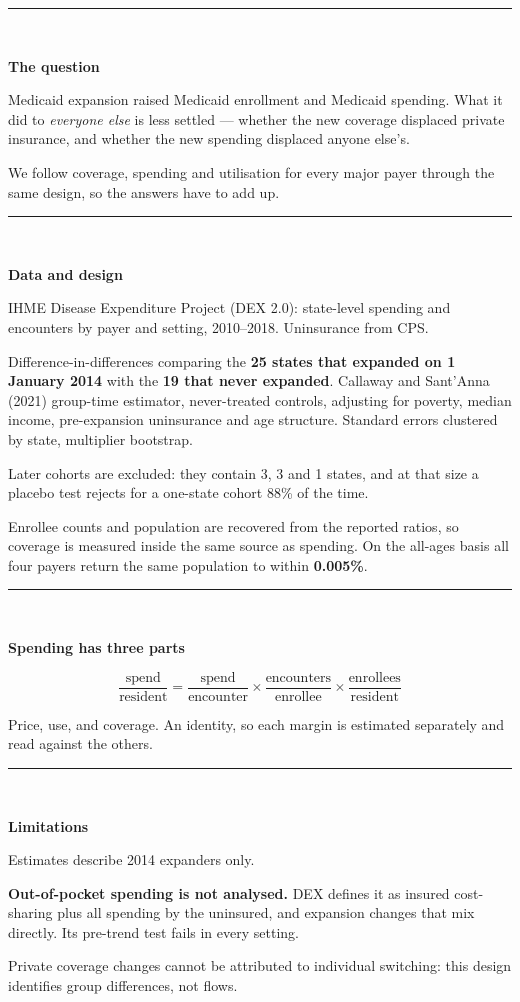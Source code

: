 \documentclass[final]{article}
\newlength{\colw}\setlength{\colw}{247mm}
\newlength{\colh}\setlength{\colh}{845mm}
\newcommand{\Body}[1]{{\fontsize{29}{40}\selectfont\RaggedRight #1\par}}
\newcommand{\Note}[1]{{\fontsize{23}{31}\selectfont\color{WarmGray}\RaggedRight #1\par}}
\newcommand{\Num}[1]{\textbf{\color{Treat}#1}}
\newcommand{\panel}[2]{%
  \noindent\begin{minipage}[t]{\colw}%
    {\color{LightGray}\rule{\colw}{2.5pt}}\\[4mm]
    {\fontsize{38}{46}\selectfont\bfseries\color{DeepNavy}\RaggedRight #1\par}
    \vspace{5mm} #2
  \end{minipage}}
\begin{document}
\begin{minipage}[t][\colh][t]{\colw}
\panel{The question}{
  \Body{Medicaid expansion raised Medicaid enrollment and Medicaid spending. What it did to
  \emph{everyone else} is less settled --- whether the new coverage displaced private
  insurance, and whether the new spending displaced anyone else's.}
  \vspace{4mm}
  \Body{We follow coverage, spending and utilisation for every major payer through the
  same design, so the answers have to add up.}
}
\vfill
\panel{Data and design}{
  \Body{IHME Disease Expenditure Project (DEX 2.0): state-level spending and encounters by
  payer and setting, 2010--2018. Uninsurance from CPS.}
  \vspace{4mm}
  \Body{Difference-in-differences comparing the \Num{25 states that expanded on 1 January
  2014} with the \Num{19 that never expanded}. Callaway and Sant'Anna (2021) group-time
  estimator, never-treated controls, adjusting for poverty, median income, pre-expansion
  uninsurance and age structure. Standard errors clustered by state, multiplier bootstrap.}
  \vspace{4mm}
  \Note{Later cohorts are excluded: they contain 3, 3 and 1 states, and at that size a
  placebo test rejects for a one-state cohort 88\% of the time.}
  \vspace{4mm}
  \Body{Enrollee counts and population are recovered from the reported ratios, so coverage
  is measured inside the same source as spending. On the all-ages basis all four payers
  return the same population to within \Num{0.005\%}.}
}
\vfill
\panel{Spending has three parts}{
  \Body{\[\frac{\text{spend}}{\text{resident}}=\frac{\text{spend}}{\text{encounter}}\times
  \frac{\text{encounters}}{\text{enrollee}}\times\frac{\text{enrollees}}{\text{resident}}\]}
  \vspace{2mm}
  \Body{Price, use, and coverage. An identity, so each margin is estimated separately and
  read against the others.}
}
\vfill
\panel{Limitations}{
  \Body{Estimates describe 2014 expanders only.}
  \vspace{3mm}
  \Body{\textbf{Out-of-pocket spending is not analysed.} DEX defines it as insured
  cost-sharing plus all spending by the uninsured, and expansion changes that mix directly.
  Its pre-trend test fails in every setting.}
  \vspace{3mm}
  \Body{Private coverage changes cannot be attributed to individual switching: this design
  identifies group differences, not flows.}
}
\end{minipage}
\end{document}
